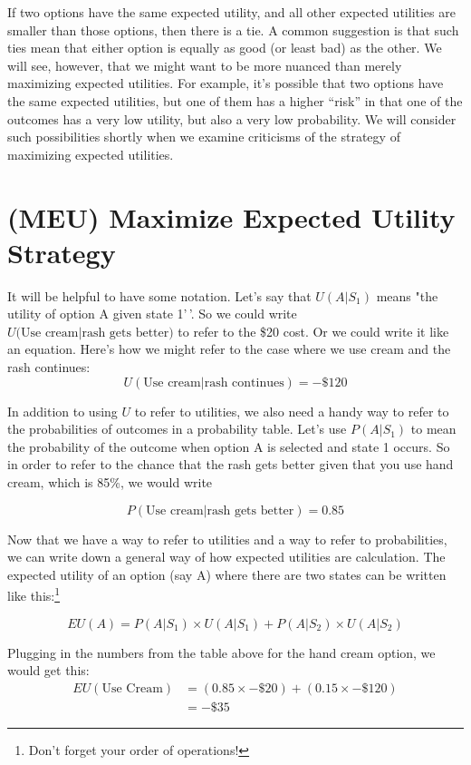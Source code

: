 \documentclass[]{tufte-book}
\begin{document}
If two options have the same expected utility, and all other expected utilities are smaller than those options, then there is a tie. A common suggestion is that such ties mean that either option is equally as good (or least bad) as the other. We will see, however, that we might want to be more nuanced than merely maximizing expected utilities. For example, it's possible that two options have the same expected utilities, but one of them has a higher ``risk'' in that one of the outcomes has a very low utility, but also a very low probability. We will consider such possibilities shortly when we examine criticisms of the strategy of maximizing expected utilities.

\hypertarget{meu-maximize-expected-utility-strategy}{%
\section{(MEU) Maximize Expected Utility Strategy}\label{meu-maximize-expected-utility-strategy}}

It will be helpful to have some notation. Let's say that \(U(A|S_1)\) means "the utility of option A given state 1'\,'. So we could write \(U\text{(Use cream}|\text{rash gets better})\) to refer to the \$20 cost. Or we could write it like an equation. Here's how we might refer to the case where we use cream and the rash continues:
\[
U(\text{Use cream} | \text{rash continues}) = -\$120
\]

In addition to using \(U\) to refer to utilities, we also need a handy way to refer to the probabilities of outcomes in a probability table.
Let's use \(P(A|S_1)\) to mean the probability of the outcome when option A is selected and state 1 occurs. So in order to refer to the chance that the rash gets better given that you use hand cream, which is 85\%, we would write

\[
P(\text{Use cream} | \text{rash gets better}) = 0.85
\]

Now that we have a way to refer to utilities and a way to refer to probabilities, we can write down a general way of how expected utilities are calculation. The expected utility of an option (say A) where there are two states can be written like this:\footnote{Don't forget your order of operations!}

\[
EU(A) = P(A|S_1)\times U(A|S_1) +  P(A|S_2)\times U(A|S_2)
\]

Plugging in the numbers from the table above for the hand cream option, we would get this:
\[
  \begin{aligned}
  EU(\text{Use Cream}) &= (0.85\times -\$20) + (0.15\times -\$120)\\
      &= -\$35
  \end{aligned}
\]
\end{document}

